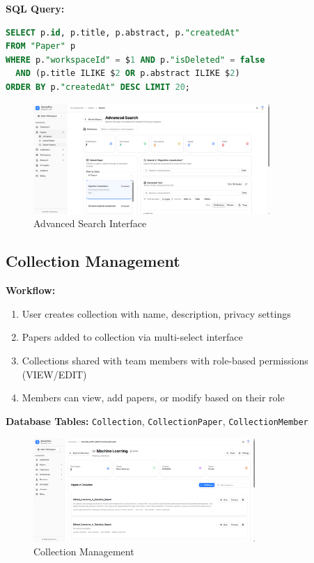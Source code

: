 \textbf{SQL Query:}
\begin{lstlisting}[language=SQL,basicstyle=\tiny\ttfamily]
SELECT p.id, p.title, p.abstract, p."createdAt"
FROM "Paper" p
WHERE p."workspaceId" = $1 AND p."isDeleted" = false
  AND (p.title ILIKE $2 OR p.abstract ILIKE $2)
ORDER BY p."createdAt" DESC LIMIT 20;
\end{lstlisting}

\begin{figure}[H]
\centering
\includegraphics[width=0.8\textwidth]{images/screenshots/advanced_search.png}
\caption{Advanced Search Interface}
\label{fig:search}
\end{figure}

\subsection{Collection Management}

\textbf{Workflow:}
\begin{enumerate}[leftmargin=*,topsep=3pt,itemsep=2pt]
    \item User creates collection with name, description, privacy settings
    \item Papers added to collection via multi-select interface
    \item Collections shared with team members with role-based permissions (VIEW/EDIT)
    \item Members can view, add papers, or modify based on their role
\end{enumerate}

\textbf{Database Tables:} \texttt{Collection}, \texttt{CollectionPaper}, \texttt{CollectionMember}

\begin{figure}[H]
\centering
\includegraphics[width=0.75\textwidth]{images/screenshots/collection_details.png}
\caption{Collection Management}
\label{fig:collection}
\end{figure}


